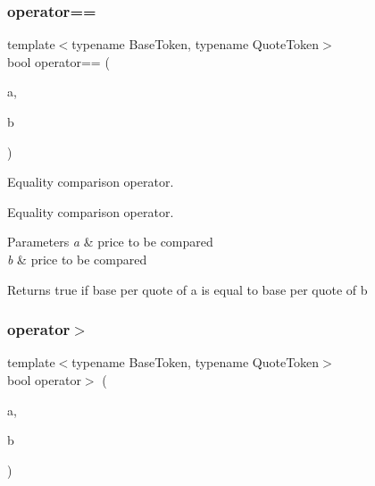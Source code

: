 \subsubsection{\texorpdfstring{operator==}{operator==}}
{\footnotesize\ttfamily template$<$typename Base\+Token, typename Quote\+Token$>$ \\
bool operator== (\begin{DoxyParamCaption}\item[{const \mbox{\hyperlink{structaacio_1_1price}{price}}$<$ Base\+Token, Quote\+Token $>$ \&}]{a,  }\item[{const \mbox{\hyperlink{structaacio_1_1price}{price}}$<$ Base\+Token, Quote\+Token $>$ \&}]{b }\end{DoxyParamCaption})\hspace{0.3cm}{\ttfamily [friend]}}



Equality comparison operator. 

Equality comparison operator. 
\begin{DoxyParams}{Parameters}
{\em a} & price to be compared \\
\hline
{\em b} & price to be compared \\
\hline
\end{DoxyParams}
\begin{DoxyReturn}{Returns}
true if base per quote of a is equal to base per quote of b 
\end{DoxyReturn}
\mbox{\label{structaacio_1_1price_a1d386990660f40b6cd35f5da903b9d3e}} 
\subsubsection{\texorpdfstring{operator$>$}{operator>}}
{\footnotesize\ttfamily template$<$typename Base\+Token, typename Quote\+Token$>$ \\
bool operator$>$ (\begin{DoxyParamCaption}\item[{const \mbox{\hyperlink{structaacio_1_1price}{price}}$<$ Base\+Token, Quote\+Token $>$ \&}]{a,  }\item[{const \mbox{\hyperlink{structaacio_1_1price}{price}}$<$ Base\+Token, Quote\+Token $>$ \&}]{b }\end{DoxyParamCaption})\hspace{0.3cm}{\ttfamily [friend]}}



